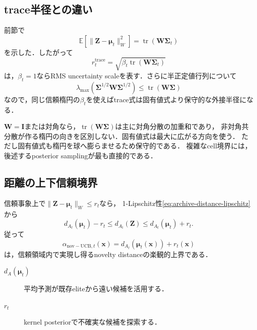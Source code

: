 \documentclass[a4paper,11pt]{ltjsarticle}
\newcommand{\E}{\mathbb E}
\newcommand{\I}{\bm I}
\newcommand{\tr}{\operatorname{tr}}
\begin{document}
\subsection{trace半径との違い}

前節で
\begin{equation}
  \E[\|\bm Z-\bm\mu_t\|_W^2]
  =\tr(\bm W\bm\Sigma_t)
\end{equation}
を示した．したがって
\begin{equation}
  r_t^{\mathrm{trace}}
  =\sqrt{\beta_t\tr(\bm W\bm\Sigma_t)}
  \label{eq:trace-radius}
\end{equation}
は，\(\beta_t=1\)ならRMS uncertainty scaleを表す．さらに半正定値行列について
\begin{equation}
  \lambda_{\max}(\bm\Sigma^{1/2}\bm W\bm\Sigma^{1/2})
  \leq\tr(\bm W\bm\Sigma)
\end{equation}
なので，同じ信頼楕円の\(\beta_t\)を使えばtrace式は固有値式より保守的な外接半径になる．

\begin{cautionbox}
\(\bm W=\I\)または対角なら，\(\tr(\bm W\bm\Sigma)\)は主に対角分散の加重和であり，
非対角共分散が作る楕円の向きを区別しない．固有値式は最大に広がる方向を使う．
ただし固有値式も楕円を球へ膨らませるため保守的である．
複雑なcell境界には，後述するposterior samplingが最も直接的である．
\end{cautionbox}

\subsection{距離の上下信頼境界}

信頼事象上で\(\|\bm Z-\bm\mu_t\|_W\leq r_t\)なら，
1-Lipschitz性\eqref{eq:archive-distance-lipschitz}から
\begin{equation}
  \boxed{
  d_{A_t}(\bm\mu_t)-r_t
  \leq d_{A_t}(\bm Z)
  \leq d_{A_t}(\bm\mu_t)+r_t.}
  \label{eq:novelty-distance-bounds}
\end{equation}
従って
\begin{equation}
  \boxed{
  \alpha_{\mathrm{nov-UCB},t}(\bm x)
  =d_{A_t}(\bm\mu_t(\bm x))+r_t(\bm x)}
  \label{eq:novelty-ucb}
\end{equation}
は，信頼領域内で実現し得るnovelty distanceの楽観的上界である．

\begin{description}
  \item[\(d_A(\bm\mu_t)\)] 平均予測が既存eliteから遠い候補を活用する．
  \item[\(r_t\)] kernel posteriorで不確実な候補を探索する．
\end{description}
\end{document}
